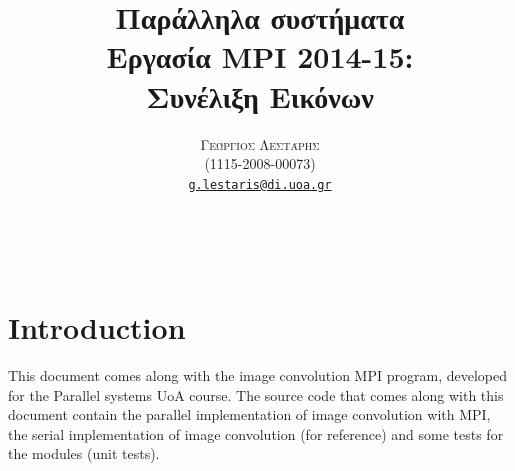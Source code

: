 \documentclass[11pt,a4paper,oneside]{article}
\begin{document}

\title{
    {\large Παράλληλα συστήματα}\\
    Εργασία MPI 2014-15:\\
    Συνέλιξη Εικόνων
}
\author{
    \textsc{Γεώργιος Λεστάρης}\\
    (1115-2008-00073)\\
    \href{mailto:g.lestaris@di.uoa.gr}{\texttt{g.lestaris@di.uoa.gr}}
}



\makeatletter
\begin{center}
    {\LARGE\@title}
\end{center}
\vspace{10pt}
\begin{flushright}
    {\large\@author}
    \\\@date
\end{flushright}
\vspace{20pt}



\tableofcontents



\section{Introduction}

This document comes along with the image convolution MPI program, developed for
the Parallel systems UoA course. The source code that comes along with this
document contain the parallel implementation of image convolution with MPI,
the serial implementation of image convolution (for reference) and some tests
for the modules (unit tests).
\end{document}

